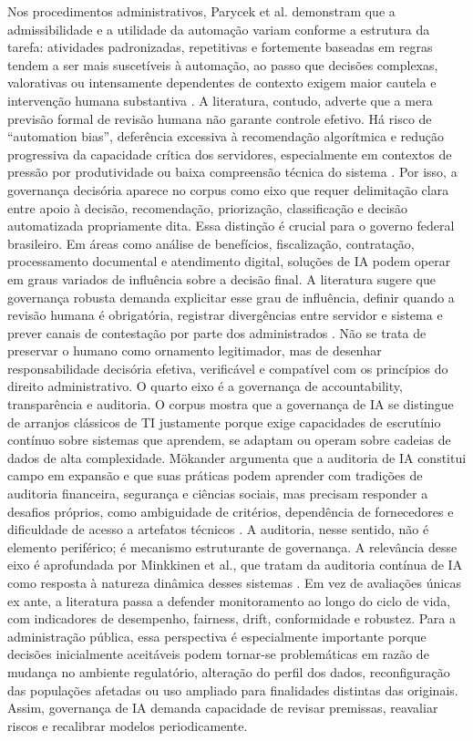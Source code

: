 \documentclass[12pt,a4paper]{article}
\begin{document}
Nos procedimentos administrativos, Parycek et al. demonstram que a admissibilidade e a utilidade da automação variam conforme a estrutura da tarefa: atividades padronizadas, repetitivas e fortemente baseadas em regras tendem a ser mais suscetíveis à automação, ao passo que decisões complexas, valorativas ou intensamente dependentes de contexto exigem maior cautela e intervenção humana substantiva \autocite{parycek2023artificial}. A literatura, contudo, adverte que a mera previsão formal de revisão humana não garante controle efetivo. Há risco de “automation bias”, deferência excessiva à recomendação algorítmica e redução progressiva da capacidade crítica dos servidores, especialmente em contextos de pressão por produtividade ou baixa compreensão técnica do sistema \autocite{pi2021machine} \autocite{sigfrids2022how}.
Por isso, a governança decisória aparece no corpus como eixo que requer delimitação clara entre apoio à decisão, recomendação, priorização, classificação e decisão automatizada propriamente dita. Essa distinção é crucial para o governo federal brasileiro. Em áreas como análise de benefícios, fiscalização, contratação, processamento documental e atendimento digital, soluções de IA podem operar em graus variados de influência sobre a decisão final. A literatura sugere que governança robusta demanda explicitar esse grau de influência, definir quando a revisão humana é obrigatória, registrar divergências entre servidor e sistema e prever canais de contestação por parte dos administrados \autocite{sigfrids2022how} \autocite{criado2024inteligencia}. Não se trata de preservar o humano como ornamento legitimador, mas de desenhar responsabilidade decisória efetiva, verificável e compatível com os princípios do direito administrativo.
O quarto eixo é a governança de accountability, transparência e auditoria. O corpus mostra que a governança de IA se distingue de arranjos clássicos de TI justamente porque exige capacidades de escrutínio contínuo sobre sistemas que aprendem, se adaptam ou operam sobre cadeias de dados de alta complexidade. Mökander argumenta que a auditoria de IA constitui campo em expansão e que suas práticas podem aprender com tradições de auditoria financeira, segurança e ciências sociais, mas precisam responder a desafios próprios, como ambiguidade de critérios, dependência de fornecedores e dificuldade de acesso a artefatos técnicos \autocite{mkander2023auditing}. A auditoria, nesse sentido, não é elemento periférico; é mecanismo estruturante de governança.
A relevância desse eixo é aprofundada por Minkkinen et al., que tratam da auditoria contínua de IA como resposta à natureza dinâmica desses sistemas \autocite{minkkinen2022continuous}. Em vez de avaliações únicas ex ante, a literatura passa a defender monitoramento ao longo do ciclo de vida, com indicadores de desempenho, fairness, drift, conformidade e robustez. Para a administração pública, essa perspectiva é especialmente importante porque decisões inicialmente aceitáveis podem tornar-se problemáticas em razão de mudança no ambiente regulatório, alteração do perfil dos dados, reconfiguração das populações afetadas ou uso ampliado para finalidades distintas das originais. Assim, governança de IA demanda capacidade de revisar premissas, reavaliar riscos e recalibrar modelos periodicamente.
\end{document}
